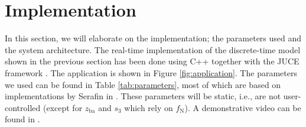 \documentclass[twoside,a4paper,dvipsnames]{article}
\begin{document}

\section{Implementation}\label{sec:implementation}
In this section, we will elaborate on the implementation; the parameters used and the system architecture. The real-time implementation of the discrete-time model shown in the previous section has been done using C++ together with the JUCE framework \cite{JUCE}. The application is shown in Figure \ref{fig:application}. The parameters we used can be found in Table \ref{tab:parameters}, most of which are based on implementations by Serafin in \cite{Serafin2004}. These parameters will be static, i.e., are not user-controlled (except for $z_\text{ba}$ and $s_3$ which rely on $f_\text{N}$). A demonstrative video can be found in \cite{video}.
    
\end{document}

